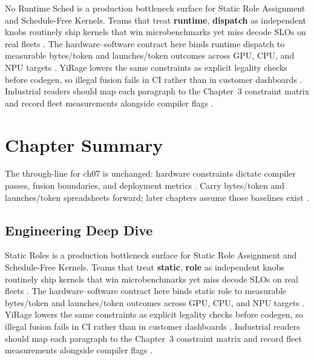 No Runtime Sched is a production bottleneck surface for Static Role Assignment and Schedule-Free Kernels. Teams that treat \textbf{runtime}, \textbf{dispatch} as independent knobs routinely ship kernels that win microbenchmarks yet miss decode SLOs on real fleets \citep{nvidia2022hopper,amd2024aie}. The hardware--software contract here binds runtime dispatch to measurable bytes/token and launches/token outcomes across GPU, CPU, and NPU targets \citep{semianalysis2024tma,dlbook}. YiRage lowers the same constraints as explicit legality checks before codegen, so illegal fusion fails in CI rather than in customer dashboards \citep{amd2024xdna,dao2022flashattention}. Industrial readers should map each paragraph to the Chapter~3 constraint matrix and record fleet measurements alongside compiler flags \citep{amd2024aie,kwon2023vllm}.

\section{Chapter Summary}
\label{sec:ch07_summary}

The through-line for ch07 is unchanged: hardware constraints dictate compiler passes, fusion boundaries, and deployment metrics \citep{memoryfloor2026,amd2024xdna}. Carry bytes/token and launches/token spreadsheets forward; later chapters assume those baselines exist \citep{semianalysis2024tma,dlbook}.


\subsection{Engineering Deep Dive}
\label{sec:ch07_deep_dive}

Static Roles is a production bottleneck surface for Static Role Assignment and Schedule-Free Kernels. Teams that treat \textbf{static}, \textbf{role} as independent knobs routinely ship kernels that win microbenchmarks yet miss decode SLOs on real fleets \citep{semianalysis2024tma,dlbook}. The hardware--software contract here binds static role to measurable bytes/token and launches/token outcomes across GPU, CPU, and NPU targets \citep{amd2024xdna,dao2022flashattention}. YiRage lowers the same constraints as explicit legality checks before codegen, so illegal fusion fails in CI rather than in customer dashboards \citep{amd2024aie,kwon2023vllm}. Industrial readers should map each paragraph to the Chapter~3 constraint matrix and record fleet measurements alongside compiler flags \citep{dlbook,nvidia2024cudagraphs}.

